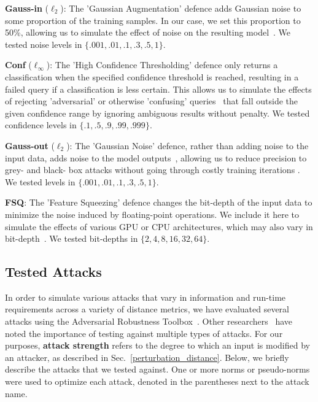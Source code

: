 \textbf{Gauss-in} ($\ell_2$): The 'Gaussian Augmentation' defence adds Gaussian noise to some proportion of the training samples. In our case, we set this proportion to 50\%, allowing us to simulate the effect of noise on the resulting model~\citep{gauss_aug}. We tested noise levels in $\{.001, .01, .1, .3, .5, 1\}$.

\textbf{Conf} ($\ell_{\infty}$): The 'High Confidence Thresholding' defence only returns a classification when the specified confidence threshold is reached, resulting in a failed query if a classification is less certain. This allows us to simulate the effects of rejecting 'adversarial' or otherwise 'confusing' queries~\citep{high_conf} that fall outside the given confidence range by ignoring ambiguous results without penalty. We tested confidence levels in $\{.1, .5, .9, .99, .999\}$.

\textbf{Gauss-out} ($\ell_2$): The 'Gaussian Noise' defence, rather than adding noise to the input data, adds noise to the model outputs~\citep{gauss_out}, allowing us to reduce precision to grey- and black- box attacks without going through costly training iterations . We tested levels in $\{.001, .01, .1, .3, .5, 1\}$. 

\textbf{FSQ}: The 'Feature Squeezing' defence changes the bit-depth of the input data to minimize the noise induced by floating-point operations. We include it here to simulate the effects of various GPU or CPU architectures, which may also vary in bit-depth~\citep{feature_squeezing}. We tested bit-depths in $\{2, 4, 8, 16, 32, 64\}$.



\subsection{Tested Attacks}
\label{attacks}

In order to simulate various attacks that vary in information and run-time requirements across a variety of distance metrics, we have evaluated several attacks using the Adversarial Robustness Toolbox~\citep{art2018}. Other researchers~\citep{carlini_towards_2017} have noted the importance of testing against multiple types of attacks. For our purposes, \textbf{attack strength} refers to the degree to which an input is modified by an attacker, as described in Sec.~\ref{perturbation_distance}. Below, we briefly describe the attacks that we tested against. One or more norms or pseudo-norms were used to optimize each attack, denoted in the parentheses next to the attack name. 

